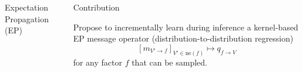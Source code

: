\documentclass[english]{beamer}
\begin{document}
\begin{frame}
\begin{columns}[t]
\begin{block}{Expectation Propagation (EP)}
%
\end{block}













\begin{block}{Contribution }

Propose to incrementally learn during inference a kernel-based EP message operator 
(distribution-to-distribution regression)
%
\begin{equation*}
    \left[ m_{V'\rightarrow f}  \right]_{V' \in \mathrm{ne}(f)} \mapsto q_{f \rightarrow V}
\end{equation*}
%
for any factor $f$ that can be sampled. 






\end{block}
\end{columns}
\end{frame}
\end{document}
